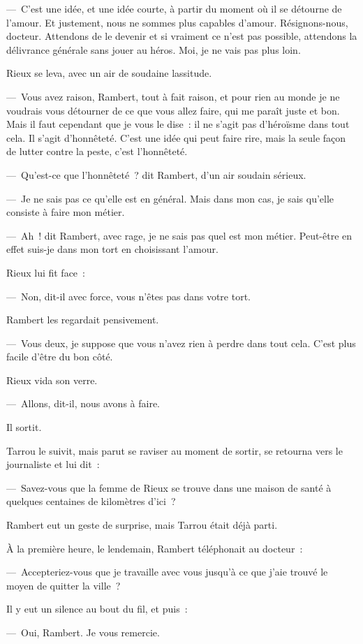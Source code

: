 \documentclass[french,twoside]{book} %
\newcommand\chapterclose{} %
\begin{document}
— C’est une idée, et une idée courte, à partir du moment où il se détourne de l’amour. Et justement, nous ne sommes plus capables d’amour. Résignons-nous, docteur. Attendons de le devenir et si vraiment ce n’est pas possible, attendons la délivrance générale sans jouer au héros. Moi, je ne vais pas plus loin.\par
Rieux se leva, avec un air de soudaine lassitude.\par
— Vous avez raison, Rambert, tout à fait raison, et pour rien au monde je ne voudrais vous détourner de ce que vous allez faire, qui me paraît juste et bon. Mais il faut cependant que je vous le dise : il ne s’agit pas d’héroïsme dans tout cela. Il s’agit d’honnêteté. C’est une idée qui peut faire rire, mais la seule façon de lutter contre la peste, c’est l’honnêteté.\par
— Qu’est-ce que l’honnêteté ? dit Rambert, d’un air soudain sérieux.\par
— Je ne sais pas ce qu’elle est en général. Mais dans mon cas, je sais qu’elle consiste à faire mon métier.\par
— Ah ! dit Rambert, avec rage, je ne sais pas quel est mon métier. Peut-être en effet suis-je dans mon tort en choisissant l’amour.\par
Rieux lui fit face :\par
— Non, dit-il avec force, vous n’êtes pas dans votre tort.\par
Rambert les regardait pensivement.\par
— Vous deux, je suppose que vous n’avez rien à perdre dans tout cela. C’est plus facile d’être du bon côté.\par
Rieux vida son verre.\par
— Allons, dit-il, nous avons à faire.\par
Il sortit.\par
Tarrou le suivit, mais parut se raviser au moment de sortir, se retourna vers le journaliste et lui dit :\par
— Savez-vous que la femme de Rieux se trouve dans une maison de santé à quelques centaines de kilomètres d’ici ?\par
Rambert eut un geste de surprise, mais Tarrou était déjà parti.\par
À la première heure, le lendemain, Rambert téléphonait au docteur :\par
— Accepteriez-vous que je travaille avec vous jusqu’à ce que j’aie trouvé le moyen de quitter la ville ?\par
Il y eut un silence au bout du fil, et puis :\par
— Oui, Rambert. Je vous remercie.
\chapterclose
\end{document}
